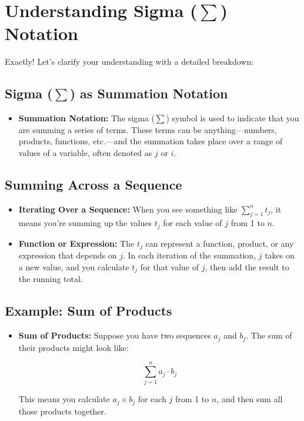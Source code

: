 \documentclass{article}
\begin{document}
\section*{Understanding Sigma (\(\sum\)) Notation}

Exactly! Let's clarify your understanding with a detailed breakdown:

\subsection*{Sigma (\(\sum\)) as Summation Notation}

\begin{itemize}
    \item \textbf{Summation Notation:} The sigma (\(\sum\)) symbol is used to indicate that you are summing a series of terms. These terms can be anything—numbers, products, functions, etc.—and the summation takes place over a range of values of a variable, often denoted as \( j \) or \( i \).
\end{itemize}

\subsection*{Summing Across a Sequence}

\begin{itemize}
    \item \textbf{Iterating Over a Sequence:} When you see something like \( \sum_{j=1}^{n} t_j \), it means you're summing up the values \( t_j \) for each value of \( j \) from 1 to \( n \).
    \item \textbf{Function or Expression:} The \( t_j \) can represent a function, product, or any expression that depends on \( j \). In each iteration of the summation, \( j \) takes on a new value, and you calculate \( t_j \) for that value of \( j \), then add the result to the running total.
\end{itemize}

\subsection*{Example: Sum of Products}

\begin{itemize}
    \item \textbf{Sum of Products:} Suppose you have two sequences \( a_j \) and \( b_j \). The sum of their products might look like:

    \[
    \sum_{j=1}^{n} a_j \cdot b_j
    \]

    This means you calculate \( a_j \times b_j \) for each \( j \) from 1 to \( n \), and then sum all those products together.
\end{itemize}
\end{document}
